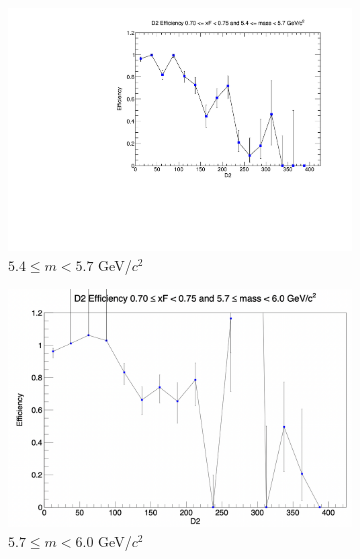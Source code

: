 \documentclass[11pt]{article}
\begin{document}
\begin{figure}[p]
\begin{subfigure}[b]{0.32\textwidth}
        \includegraphics[width=\textwidth]{./kTrackerEfficiencyPlots/D2_Efficiency_xF14_mass4.pdf}
        \caption{$5.4 \leq m < 5.7$ GeV/$c^2$}
    \end{subfigure}\hfill
    \begin{subfigure}[b]{0.32\textwidth}
        \centering
        \includegraphics[width=\textwidth]{./kTrackerEfficiencyPlots/D2_Efficiency_xF14_mass5.png}
        \caption{$5.7 \leq m < 6.0$ GeV/$c^2$}
    \end{subfigure}\vspace{0.5cm}
    \begin{subfigure}[b]{0.32\textwidth}
        \centering

\end{subfigure}
\end{figure}
\end{document}
